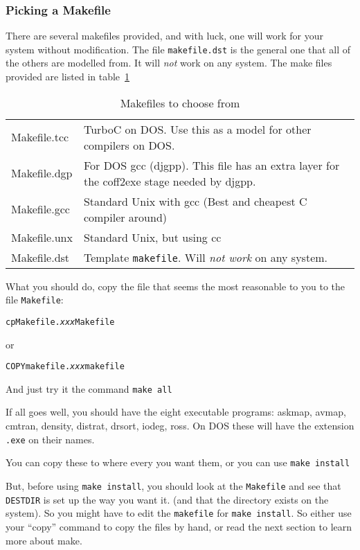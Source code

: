 \documentclass[%
	11pt,
        a4paper,
        twoside]{workrep}
\newcommand*{\prg}[1]{\textsf{#1}}		%
\newcommand*{\cmd}[1]{\texttt{#1}}		%
\newcommand*{\file}[1]{\texttt{#1}}		%
\begin{document}
\subsubsection{Picking a Makefile}\label{sec:pickmake}

There are several makefiles provided, and with luck, one will work
for your system without modification.  The file \file{makefile.dst} is
the general one that all of the others are modelled from.  It will
\emph{not} work on any system.  The make files provided are listed
in table~\ref{tab:makefiles}
\begin{table}
\begin{center}
\begin{tabular}{>{\ttfamily}lp{7.5cm}}
	Makefile.tcc &	TurboC on DOS.  Use this as a model for
			other compilers on DOS.\\
	Makefile.dgp &  For DOS \prg{gcc} (\prg{djgpp}).  This file has
			an extra layer for the \prg{coff2exe}
			stage needed by \prg{djgpp}. \\
	Makefile.gcc &	Standard Unix with \prg{gcc} (Best and cheapest
                        C compiler around) \\
	Makefile.unx &	Standard Unix, but using \prg{cc}\\
	Makefile.dst &	Template \file{makefile}.  Will \emph{not work}
			on any system.
\end{tabular}
\end{center}
\caption{Makefiles to choose from}\label{tab:makefiles}
\end{table}

What you should do, copy the file that seems the most reasonable to
you to the file \file{Makefile}:

\begin{alltt}
  cp Makefile.\textit{xxx} Makefile
\end{alltt}
or
\begin{alltt}
  COPY makefile.\textit{xxx} makefile
\end{alltt}

And just try it the command \cmd{make all}

If all goes well, you should have the eight executable programs:
\prg{askmap}, \prg{avmap}, \prg{cmtran}, \prg{density}, \prg{distrat},
\prg{drsort}, \prg{iodeg}, \prg{ross}.  On DOS these will have
the extension \file{.exe} on their names.

You can copy these to where every you want them, or you can use
\cmd{make install}

But, before using \cmd{make install}, you should look at the \file{Makefile}
and see that \texttt{DESTDIR} is set up the way you want it.  (and that
the directory exists on the system).  So you might have to
edit the \file{makefile} for \cmd{make install}.  So either use your
``copy'' command to copy the files by hand, or read the next section
to learn more about \prg{make}.
\end{document}
